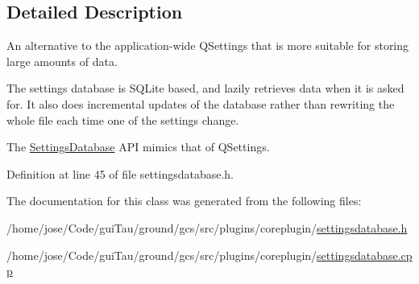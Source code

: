 \subsection{Detailed Description}
An alternative to the application-\/wide Q\-Settings that is more suitable for storing large amounts of data. 

The settings database is S\-Q\-Lite based, and lazily retrieves data when it is asked for. It also does incremental updates of the database rather than rewriting the whole file each time one of the settings change.

The \hyperlink{class_core_1_1_settings_database}{Settings\-Database} A\-P\-I mimics that of Q\-Settings. 

Definition at line 45 of file settingsdatabase.\-h.



The documentation for this class was generated from the following files\-:\begin{DoxyCompactItemize}
\item 
/home/jose/\-Code/gui\-Tau/ground/gcs/src/plugins/coreplugin/\hyperlink{settingsdatabase_8h}{settingsdatabase.\-h}\item 
/home/jose/\-Code/gui\-Tau/ground/gcs/src/plugins/coreplugin/\hyperlink{settingsdatabase_8cpp}{settingsdatabase.\-cpp}\end{DoxyCompactItemize}
